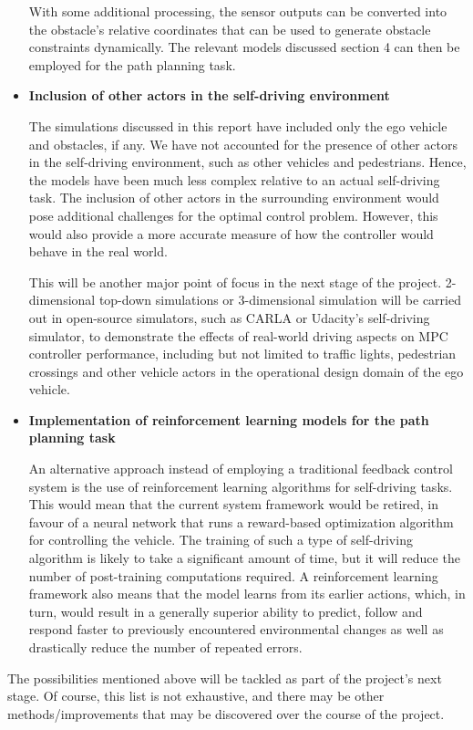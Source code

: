 \begin{itemize}
    With some additional processing, the sensor outputs can be converted into the obstacle's relative coordinates that can be used to generate obstacle constraints dynamically. The relevant models discussed section 4 can then be employed for the path planning task.

    \item \textbf{Inclusion of other actors in the self-driving environment}
    
    The simulations discussed in this report have included only the ego vehicle and obstacles, if any. We have not accounted for the presence of other actors in the self-driving environment, such as other vehicles and pedestrians. Hence, the models have been much less complex relative to an actual self-driving task. The inclusion of other actors in the surrounding environment would pose additional challenges for the optimal control problem. However, this would also provide a more accurate measure of how the controller would behave in the real world.

    This will be another major point of focus in the next stage of the project. 2-dimensional top-down simulations or 3-dimensional simulation will be carried out in open-source simulators, such as CARLA or Udacity's self-driving simulator, to demonstrate the effects of real-world driving aspects on MPC controller performance, including but not limited to traffic lights, pedestrian crossings and other vehicle actors in the operational design domain of the ego vehicle.

    \item \textbf{Implementation of reinforcement learning models for the path planning task}

    An alternative approach instead of employing a traditional feedback control system is the use of reinforcement learning algorithms for self-driving tasks. This would mean that the current system framework would be retired, in favour of a neural network that runs a reward-based optimization algorithm for controlling the vehicle. The training of such a type of self-driving algorithm is likely to take a significant amount of time, but it will reduce the number of post-training computations required. A reinforcement learning framework also means that the model learns from its earlier actions, which, in turn, would result in a generally superior ability to predict, follow and respond faster to previously encountered environmental changes as well as drastically reduce the number of repeated errors.
\end{itemize}

\noindent The possibilities mentioned above will be tackled as part of the project's next stage. Of course, this list is not exhaustive, and there may be other methods/improvements that may be discovered over the course of the project.